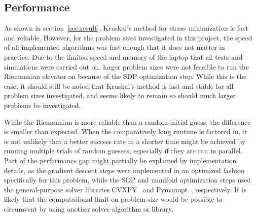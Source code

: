 \subsection{Performance}
As shown in section~\ref{sec:result}, Kruskal's method for stress minimization is fast and reliable. However, for the problem sizes investigated in this project, the speed of all implemented algorithms was fast enough that it does not matter in practice. Due to the limited speed and memory of the laptop that all tests and simulations were carried out on, larger problem sizes were not feasible to run the Riemannian elevator on because of the SDP optimization step. While this is the case, it should still be noted that Kruskal's method is fast and stable for all problem sizes investigated, and seems likely to remain so should much larger problems be investigated. 

While the Riemannian is more reliable than a random initial guess, the difference is smaller than expected. When the comparatively long runtime is factored in, it is not unlikely that a better success rate in a shorter time might be achieved by running multiple trials of random guesses, especially if they are ran in parallel. Part of the performance gap might partially be explained by implementation details, as the gradient descent steps were implemented in an optimized fashion specifically for this problem, while the SDP and manifold optimization steps used the general-purpose solver libraries CVXPY~\cite{cvxpy1,cvxpy2} and Pymanopt~\cite{pymanopt}, respectively. It is likely that the computational limit on problem size would be possible to circumvent by using another solver algorithm or library. 